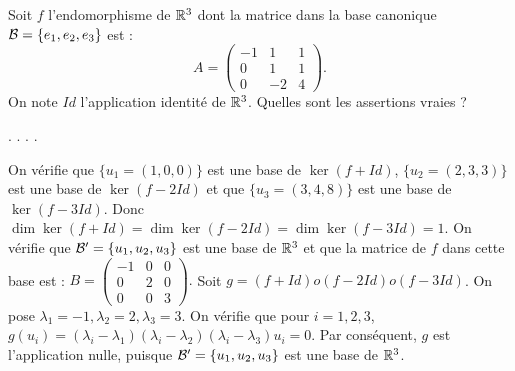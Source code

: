 \begin{question}
Soit $f$ l'endomorphisme de $\mathbb{R}^3$ dont la matrice dans la base canonique ${\cal B}=\{e_1,e_2,e_3\}$ est : 
$$A = \left(\begin{array}{rcc}
-1&1&1\\0&1&1\\ 0&-2&4\end{array}\right).$$
On note $Id$ l'application identité de $\mathbb{R}^3$. 
Quelles sont les assertions vraies ?
\begin{answers}  
.
.
.
.
\end{answers}
\begin{explanations} On vérifie que $\{u_1=(1,0,0)\}$ est une base de $\ker (f+Id)$,
$\{u_2=(2,3,3)\}$ est une base de $\ker (f-2Id)$ et que $\{u_3=(3,4,8)\}$ est une base de $\ker (f-3Id)$. 
Donc $\dim \ker (f+Id)=\dim \ker (f-2Id)= \dim \ker (f-3Id)=1$.
\vskip0mm
On vérifie que ${\cal B}' = \{u_1,u_2,u_3\}$ est une base de $\mathbb{R}^3$ et que la matrice de $f$ dans cette base 
est :  $B= \left(\begin{array}{rcc}-1&0&0\\0&2&0\\ 0&0&3\end{array}\right).$
\vskip0mm
Soit $g= (f+Id)o(f-2Id)o(f-3Id)$. On pose $\lambda_1=-1, \lambda_2=2, \lambda_3=3 $. On vérifie que pour $i=1,2,3$, $g(u_i)=(\lambda_i-\lambda_1)(\lambda_i-\lambda_2)(\lambda_i-\lambda_3)u_i=0$. Par conséquent, $g$ est l'application nulle, puisque ${\cal B}' = \{u_1,u_2,u_3\}$ est une base de $\mathbb{R}^3$.
\end{explanations}
\end{question}


